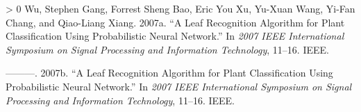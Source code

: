 \documentclass{article}
\newlength{\cslhangindent}
\newenvironment{CSLReferences}[3] %
 {%
  \setlength{\parindent}{0pt}
  \ifodd #1 \everypar{\setlength{\hangindent}{\cslhangindent}}\ignorespaces\fi
  \ifnum #2 > 0
  \setlength{\parskip}{#2\baselineskip}
  \fi
 }%
 {}
\begin{document}
\begin{CSLReferences}{1}{0}
\leavevmode\hypertarget{ref-4458016}{}%
Wu, Stephen Gang, Forrest Sheng Bao, Eric You Xu, Yu-Xuan Wang, Yi-Fan
Chang, and Qiao-Liang Xiang. 2007a. {``A Leaf Recognition Algorithm for
Plant Classification Using Probabilistic Neural Network.''} In
\emph{2007 IEEE International Symposium on Signal Processing and
Information Technology}, 11--16. IEEE.

\leavevmode\hypertarget{ref-wu2007leaf}{}%
---------. 2007b. {``A Leaf Recognition Algorithm for Plant
Classification Using Probabilistic Neural Network.''} In \emph{2007
{IEEE} International Symposium on Signal Processing and Information
Technology}, 11--16. IEEE.

\end{CSLReferences}



\end{document}
